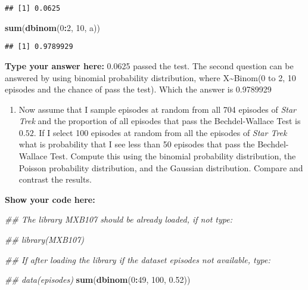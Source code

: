 \documentclass[
]{article}
\newenvironment{Shaded}{\begin{snugshade}}{\end{snugshade}}
\newcommand{\CommentTok}[1]{\textcolor[rgb]{0.56,0.35,0.01}{\textit{#1}}}
\newcommand{\DecValTok}[1]{\textcolor[rgb]{0.00,0.00,0.81}{#1}}
\newcommand{\FloatTok}[1]{\textcolor[rgb]{0.00,0.00,0.81}{#1}}
\newcommand{\KeywordTok}[1]{\textcolor[rgb]{0.13,0.29,0.53}{\textbf{#1}}}
\newcommand{\NormalTok}[1]{#1}
\newcommand{\OperatorTok}[1]{\textcolor[rgb]{0.81,0.36,0.00}{\textbf{#1}}}
\providecommand{\tightlist}{%
  \setlength{\itemsep}{0pt}\setlength{\parskip}{0pt}}
\begin{document}
\begin{verbatim}
## [1] 0.0625
\end{verbatim}

\begin{Shaded}
\begin{Highlighting}[]
\KeywordTok{sum}\NormalTok{(}\KeywordTok{dbinom}\NormalTok{(}\DecValTok{0}\OperatorTok{:}\DecValTok{2}\NormalTok{, }\DecValTok{10}\NormalTok{, a))}
\end{Highlighting}
\end{Shaded}

\begin{verbatim}
## [1] 0.9789929
\end{verbatim}

\textbf{Type your answer here:} 0.0625 passed the test. The second
question can be answered by using binomial probability distribution,
where X\textasciitilde Binom(0 to 2, 10 episodes and the chance of pass
the test). Which the answer is 0.9789929

\begin{enumerate}
\def\labelenumi{\alph{enumi}.}
\setcounter{enumi}{3}
\tightlist
\item
  Now assume that I sample episodes at random from all 704 episodes of
  \emph{Star Trek} and the proportion of all episodes that pass the
  Bechdel-Wallace Test is \(0.52\). If I select 100 episodes at random
  from all the episodes of \emph{Star Trek} what is probability that I
  see less than 50 episodes that pass the Bechdel-Wallace Test. Compute
  this using the binomial probability distribution, the Poisson
  probability distribution, and the Gaussian distribution. Compare and
  contrast the results.
\end{enumerate}

\textbf{Show your code here:}

\begin{Shaded}
\begin{Highlighting}[]
\CommentTok{##  The library MXB107 should be already loaded, if not type:}

\CommentTok{##  library(MXB107)}

\CommentTok{##  If after loading the library if the dataset episodes not available, type:}

\CommentTok{##  data(episodes)}
\KeywordTok{sum}\NormalTok{(}\KeywordTok{dbinom}\NormalTok{(}\DecValTok{0}\OperatorTok{:}\DecValTok{49}\NormalTok{, }\DecValTok{100}\NormalTok{, }\FloatTok{0.52}\NormalTok{))}
\end{Highlighting}
\end{Shaded}
\end{document}
